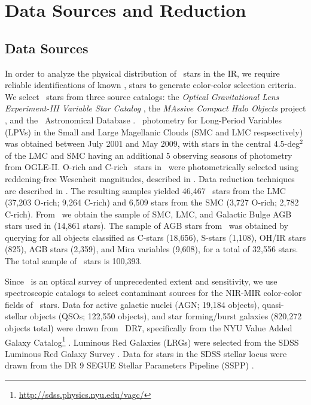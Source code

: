 \section{Data Sources and Reduction}
\label{sec:data}
\subsection{Data Sources}
In order to analyze the physical distribution of \agb\, stars in the IR, we require reliable identifications of known \agb, stars to generate color-color selection criteria. We select \agb\, stars from three source catalogs: the {\it Optical Gravitational Lens Experiment-III Variable Star Catalog} \citep[\ogle,][]{2008AcA....58...69U,2009AcA....59..239S,2011AcA....61..217S}, the {\it MAssive Compact Halo Objects} project \citep[\macho,][]{1997ApJ...482...89A}, and the \simbad\, Astronomical Database \citep{2000A&AS..143....9W}. \ogle\, photometry for Long-Period Variables (LPVs) in the Small and Large Magellanic Clouds (SMC and LMC respsectively) was obtained between July 2001 and May 2009, with stars in the central 4.5-deg$^2$ of the LMC and SMC having an additional 5 observing seasons of photometry from OGLE-II. O-rich and C-rich \agb\, stars in \ogle\, were photometrically selected using reddening-free Wesenheit magnitudes, described in \cite{2009AcA....59..239S,2011AcA....61..217S}. Data reduction techniques are described in \cite{2008AcA....58...69U}. The resulting samples yielded 46,467 \agb\, stars from the LMC (37,203 O-rich; 9,264 C-rich) and 6,509 stars from the SMC (3,727 O-rich; 2,782 C-rich). From \macho\, we obtain the sample of SMC, LMC, and Galactic Bulge AGB stars used in \cite{2008AJ....136.1242F} (14,861 stars). The sample of AGB stars from \simbad\, was obtained by querying for all objects classified as C-stars (18,656), S-stars (1,108), OH/IR stars (825), AGB stars (2,359), and Mira variables (9,608), for a total of 32,556 stars. The total sample of \agb\, stars is 100,393.

Since \sdss\, is an optical survey of unprecedented extent and sensitivity, we use \sdss\, spectroscopic catalogs to select contaminant sources for the NIR-MIR color-color fields of \agb\, stars. Data for active galactic nuclei (AGN; 19,184 objects), quasi-stellar objects (QSOs; 122,550 objects), and star forming/burst galaxies (820,272 objects total) were drawn from \sdss\, DR7, specifically from the NYU Value Added Galaxy Catalog\footnote{\url{http://sdss.physics.nyu.edu/vagc/}} \citep[VAGC]{2005AJ....129.2562B}. Luminous Red Galaxies (LRGs) were selected from the SDSS Luminous Red Galaxy Survey \citep[105,631 objects, ][]{2010ApJ...710.1444K}.  Data for stars in the SDSS stellar locus were drawn from the DR 9 SEGUE Stellar Parameters Pipeline (SSPP) \citep[1,843,190 objects, ][]{2012ApJS..203...21A}.

